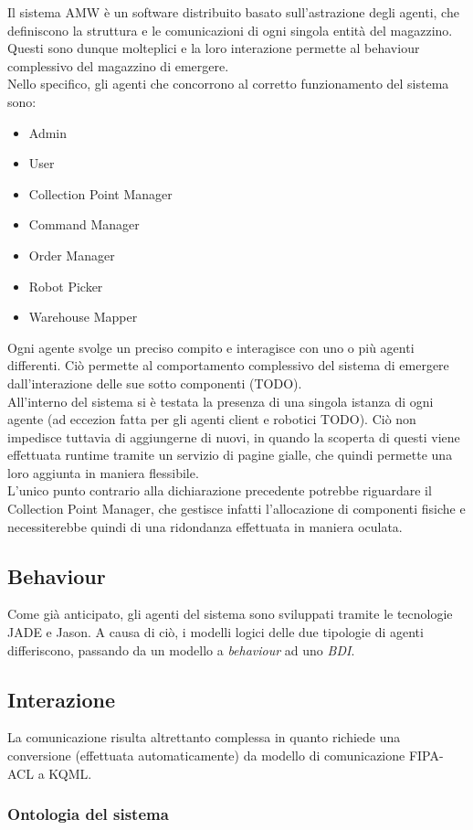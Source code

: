 Il sistema AMW è un software distribuito basato sull'astrazione degli agenti, che definiscono la struttura e le comunicazioni di ogni singola entità del magazzino. Questi sono dunque molteplici e la loro interazione permette al behaviour complessivo del magazzino di emergere.\\
Nello specifico, gli agenti che concorrono al corretto funzionamento del sistema sono:
\begin{itemize}
    \item Admin
    \item User
    \item Collection Point Manager
    \item Command Manager
    \item Order Manager
    \item Robot Picker
    \item Warehouse Mapper
\end{itemize}
Ogni agente svolge un preciso compito e interagisce con uno o più agenti differenti. Ciò permette al comportamento complessivo del sistema di emergere dall'interazione delle sue sotto componenti (TODO).\\
All'interno del sistema si è testata la presenza di una singola istanza di ogni agente (ad eccezion fatta per gli agenti client e robotici TODO). Ciò non impedisce tuttavia di aggiungerne di nuovi, in quando la scoperta di questi viene effettuata runtime tramite un servizio di pagine gialle, che quindi permette una loro aggiunta in maniera flessibile.\\
L'unico punto contrario alla dichiarazione precedente potrebbe riguardare il Collection Point Manager, che gestisce infatti l'allocazione di componenti fisiche e necessiterebbe quindi di una ridondanza effettuata in maniera oculata.

\subsection{Behaviour}


Come già anticipato, gli agenti del sistema sono sviluppati tramite le tecnologie JADE e Jason. A causa di ciò, i modelli logici delle due tipologie di agenti differiscono, passando da un modello a \textit{behaviour} ad uno \textit{BDI}.

\subsection{Interazione}


La comunicazione risulta altrettanto complessa in quanto richiede una conversione (effettuata automaticamente) da modello di comunicazione FIPA-ACL a KQML.

\subsubsection{Ontologia del sistema}
